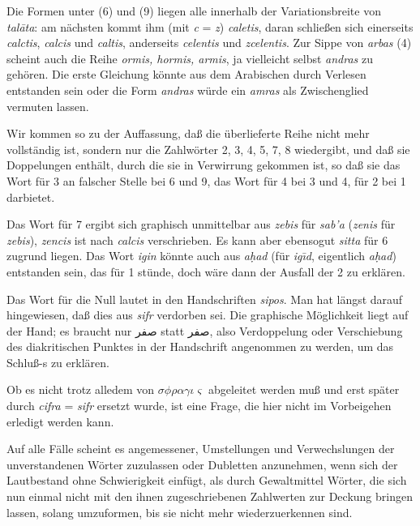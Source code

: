 \documentclass[11pt,a4paper]{article}
\newcommand{\RL}[1]{\beginR#1\endR}
\newcommand{\ar}[1]{{\arabicfont\RL{#1}}}
\begin{document}
Die Formen unter (6) und (9) liegen alle innerhalb der Variationsbreite von \textit{tal\=ata}: am n\"achsten kommt ihm (mit \textit{c} = \textit{z}) \textit{caletis}, daran schlie\ss{}en sich einerseits \textit{calctis}, \textit{calcis} und \textit{caltis}, anderseits \textit{celentis} und \textit{zcelentis}. Zur Sippe von \textit{arbas} (4) scheint auch die Reihe \textit{ormis, hormis, armis}, ja vielleicht selbst \textit{andras} zu geh\"oren. Die erste Gleichung k\"onnte aus dem Arabischen durch Verlesen entstanden sein oder die Form \textit{andras} w\"urde ein \textit{amras} als Zwischenglied vermuten lassen.

Wir kommen so zu der Auffassung, da\ss{} die \"uberlieferte Reihe nicht mehr vollst\"andig ist, sondern nur die Zahlw\"orter 2, 3, 4, 5, 7, 8 wiedergibt, und da\ss{} sie Doppelungen enth\"alt, durch die sie in Verwirrung gekommen ist, so da\ss{} sie das Wort f\"ur 3 an falscher Stelle bei 6 und 9, das Wort f\"ur 4 bei 3 und 4, f\"ur 2 bei 1 darbietet.

Das Wort f\"ur 7 ergibt sich graphisch unmittelbar aus \textit{zebis} f\"ur \textit{sab'a} (\textit{zenis} f\"ur \textit{zebis}), \textit{zencis} ist nach \textit{calcis} verschrieben. Es kann aber ebensogut \textit{sitta} f\"ur 6 zugrund liegen. Das Wort \textit{igin} k\"onnte auch aus \textit{a\d{h}ad} (f\"ur \textit{ig\=ıd}, eigentlich \textit{a\d{h}ad}) entstanden sein, das f\"ur 1 st\"unde, doch w\"are dann der Ausfall der 2 zu erkl\"aren.

Das Wort f\"ur die Null lautet in den Handschriften \textit{sipos}. Man hat l\"angst darauf hingewiesen, da\ss{} dies aus \textit{sifr} verdorben sei. Die graphische M\"oglichkeit liegt auf der Hand; es braucht nur \ar{صفر} statt \ar{صفر}, also Verdoppelung oder Verschiebung des diakritischen Punktes in der Handschrift angenommen zu werden, um das Schlu\ss{}-s zu erkl\"aren.

Ob es nicht trotz alledem von $\sigma\phi\rho\alpha\gamma\iota\varsigma$ abgeleitet werden mu\ss{} und erst sp\"ater durch \textit{cifra} = \textit{sifr} ersetzt wurde, ist eine Frage, die hier nicht im Vorbeigehen erledigt werden kann.

Auf alle F\"alle scheint es angemessener, Umstellungen und Verwechslungen der unverstandenen W\"orter zuzulassen oder Dubletten anzunehmen, wenn sich der Lautbestand ohne Schwierigkeit einf\"ugt, als durch Gewaltmittel W\"orter, die sich nun einmal nicht mit den ihnen zugeschriebenen Zahlwerten zur Deckung bringen lassen, solang umzuformen, bis sie nicht mehr wiederzuerkennen sind.
\end{document}
